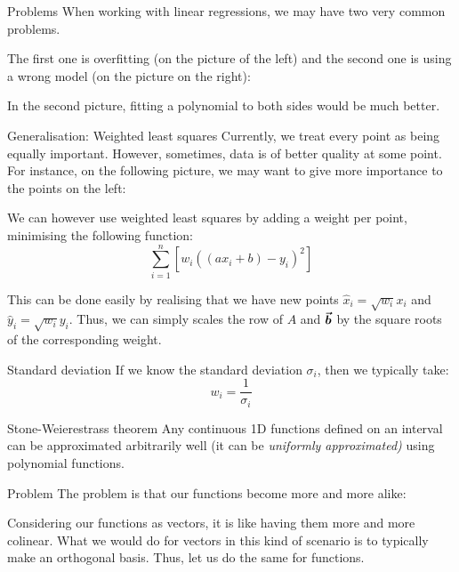 \documentclass[a4paper]{article}
\begin{document}
\begin{parag}{Problems}
    When working with linear regressions, we may have two very common problems.

    The first one is overfitting (on the picture of the left) and the second one is using a wrong model (on the picture on the right):

    In the second picture, fitting a polynomial to both sides would be much better. 
\end{parag}

\begin{parag}{Generalisation: Weighted least squares}
    Currently, we treat every point as being equally important. However, sometimes, data is of better quality at some point. For instance, on the following picture, we may want to give more importance to the points on the left:

    We can however use weighted least squares by adding a weight per point, minimising the following function: 
    \[\sum_{i=1}^{n} \left[w_i \left(\left(a x_i + b\right) - y_i\right)^2\right]\]
    
    This can be done easily by realising that we have new points $\hat{x}_i = \sqrt{w_i} x_i$ and $\hat{y}_i = \sqrt{w_i} y_i$. Thus, we can simply scales the row of $A$ and $\bm{\protect\vec{b}}$ by the square roots of the corresponding weight.

    \begin{subparag}{Standard deviation}
        If we know the standard deviation $\sigma_i$, then we typically take:
        \[w_i = \frac{1}{\sigma_i}\]
    \end{subparag}
\end{parag}

\begin{parag}{Stone-Weierestrass theorem}
    Any continuous 1D functions defined on an interval can be approximated arbitrarily well (it can be \textit{uniformly approximated)} using polynomial functions.
\end{parag}

\begin{parag}{Problem}
    The problem is that our functions become more and more alike:

    Considering our functions as vectors, it is like having them more and more colinear. What we would do for vectors in this kind of scenario is to typically make an orthogonal basis. Thus, let us do the same for functions.
\end{parag}
\end{document}
